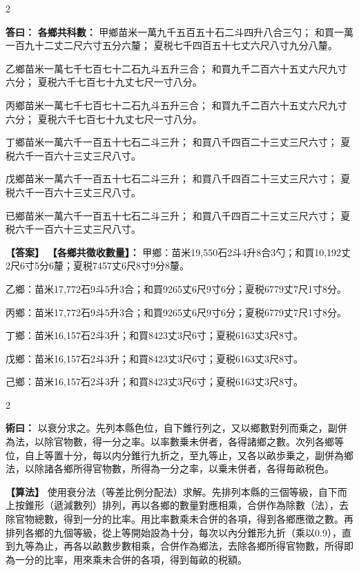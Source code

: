 \documentclass[11pt,a4paper]{article}
\newcommand{\ClassicalAnswer}[1]{\par\noindent\textbf{\color{answercolor}答曰：}#1\par}
\newcommand{\ClassicalMethod}[1]{\par\noindent\textbf{\color{methodcolor}術曰：}#1\par}
\newcommand{\ModernAnswer}[1]{\par\noindent\textbf{\color{answercolor}【答案】}#1\par}
\newcommand{\ModernMethod}[1]{\par\noindent\textbf{\color{methodcolor}【算法】}#1\par}
\begin{document}
\begin{paracol}{2}

\ClassicalAnswer{%
\textbf{各鄉共科數：}
甲鄉苗米一萬九千五百五十石二斗四升八合三勺；
和買一萬一百九十二丈二尺六寸五分六釐；
夏税七千四百五十七丈六尺八寸九分八釐。

乙鄉苗米一萬七千七百七十二石九斗五升三合；
和買九千二百六十五丈六尺九寸六分；
夏税六千七百七十九丈七尺一寸八分。

丙鄉苗米一萬七千七百七十二石九斗五升三合；
和買九千二百六十五丈六尺九寸六分；
夏税六千七百七十九丈七尺一寸八分。

丁鄉苗米一萬六千一百五十七石二斗三升；
和買八千四百二十三丈三尺六寸；
夏税六千一百六十三丈三尺八寸。

戊鄉苗米一萬六千一百五十七石二斗三升；
和買八千四百二十三丈三尺六寸；
夏税六千一百六十三丈三尺八寸。

已鄉苗米一萬六千一百五十七石二斗三升；
和買八千四百二十三丈三尺六寸；
夏税六千一百六十三丈三尺八寸。
}

\switchcolumn

\ModernAnswer{%
\textbf{【各鄉共徵收數量】：}
甲鄉：苗米19,550石2斗4升8合3勺；和買10,192丈2尺6寸5分6釐；夏税7457丈6尺8寸9分8釐。

乙鄉：苗米17,772石9斗5升3合；和買9265丈6尺9寸6分；夏税6779丈7尺1寸8分。

丙鄉：苗米17,772石9斗5升3合；和買9265丈6尺9寸6分；夏税6779丈7尺1寸8分。

丁鄉：苗米16,157石2斗3升；和買8423丈3尺6寸；夏税6163丈3尺8寸。

戊鄉：苗米16,157石2斗3升；和買8423丈3尺6寸；夏税6163丈3尺8寸。

己鄉：苗米16,157石2斗3升；和買8423丈3尺6寸；夏税6163丈3尺8寸。
}

\end{paracol}

\begin{paracol}{2}

\ClassicalMethod{%
以衰分求之。先列本縣色位，自下錐行列之，又以鄉數對列而乗之，副併為法，以除官物數，得一分之率。以率數乗未併者，各得諸鄉之數。次列各鄉等位，自上等置十分，每以内分錐行九折之，至九等止，又各以畝歩乗之，副併為鄉法，以除諸各鄉所得官物數，所得為一分之率，以乗未併者，各得毎畝税色。}

\switchcolumn

\ModernMethod{%
使用衰分法（等差比例分配法）求解。先排列本縣的三個等級，自下而上按錐形（遞減數列）排列，再以各鄉的數量對應相乘，合併作為除數（法），去除官物總數，得到一分的比率。用比率數乘未合併的各項，得到各鄉應徵之數。再排列各鄉的九個等級，從上等開始設為十分，每次以內分錐形九折（乘以0.9），直到九等為止，再各以畝數步數相乘，合併作為鄉法，去除各鄉所得官物數，所得即為一分的比率，用來乘未合併的各項，得到每畝的税額。
}

\end{paracol}
\end{document}

